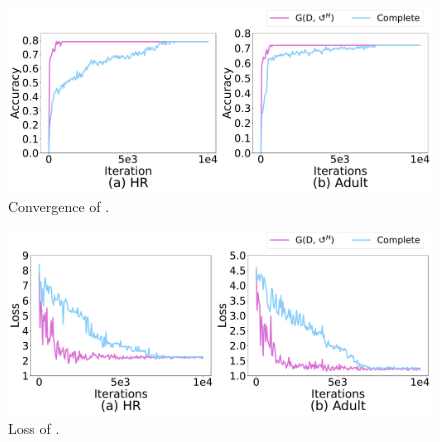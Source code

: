 











\begin{figure}
	\centering
	\includegraphics[width=0.5\columnwidth]{figs/converge}
	\caption{Convergence of \ours.}
	\label{fig:converge}
\end{figure}


\begin{figure}
	\centering
	\includegraphics[width=0.5\columnwidth]{figs/realloss}
	\caption{Loss of \ours.}
	\label{fig:real_loss}
\end{figure}



